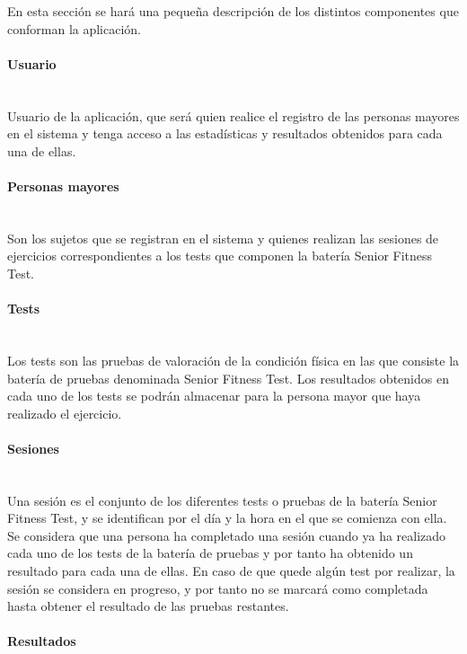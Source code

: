 En esta sección se hará una pequeña descripción de los distintos componentes que conforman la aplicación.

\paragraph{Usuario}\mbox{}\\

Usuario de la aplicación, que será quien realice el registro de las personas mayores en el sistema y tenga acceso a las estadísticas y resultados obtenidos para cada una de ellas.

\paragraph{Personas mayores}\mbox{}\\

Son los sujetos que se registran en el sistema y quienes realizan las sesiones de ejercicios correspondientes a los tests que componen la batería Senior Fitness Test.

\paragraph{Tests}\mbox{}\\

Los tests son las pruebas de valoración de la condición física en las que consiste la batería de pruebas denominada Senior Fitness Test. Los resultados obtenidos en cada uno de los tests se podrán almacenar para la persona mayor que haya realizado el ejercicio.

\paragraph{Sesiones}\mbox{}\\

Una sesión es el conjunto de los diferentes tests o pruebas de la batería Senior Fitness Test, y se identifican por el día y la hora en el que se comienza con ella. Se considera que una persona ha completado una sesión cuando ya ha realizado cada uno de los tests de la batería de pruebas y por tanto ha obtenido un resultado para cada una de ellas. En caso de que quede algún test por realizar, la sesión se considera en progreso, y por tanto no se marcará como completada hasta obtener el resultado de las pruebas restantes.

\paragraph{Resultados}\mbox{}\\

